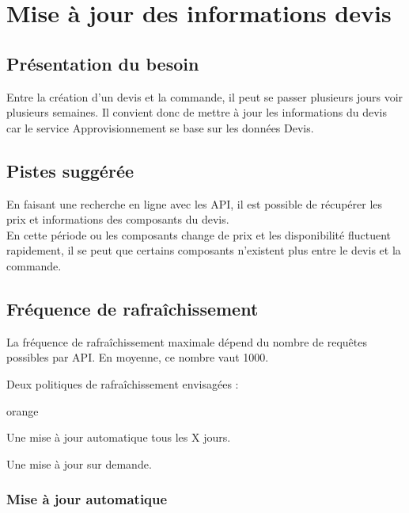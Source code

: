 
\chapter{Mise à jour des informations devis}

\section{Présentation du besoin}

Entre la création d'un devis et la commande, il peut se passer plusieurs jours voir plusieurs semaines. Il convient donc de mettre à jour les informations du devis car le service Approvisionnement se base sur les données Devis.

\section{Pistes suggérée}

En faisant une recherche en ligne avec les API, il est possible de récupérer les prix et informations des composants du devis.\\
En cette période ou les composants change de prix et les disponibilité fluctuent rapidement, il se peut que certains composants n'existent plus entre le devis et la commande.

\section{Fréquence de rafraîchissement}

La fréquence de rafraîchissement maximale dépend du nombre de requêtes possibles par API. En moyenne, ce nombre vaut 1000.

Deux politiques de rafraîchissement envisagées : 

\begin{items}{orange}{\Triangle}
\item Une mise à jour automatique tous les X jours.
\item Une mise à jour sur demande.
\end{items}


\subsection{Mise à jour automatique}

